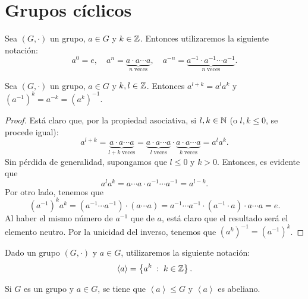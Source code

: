 \section{Grupos cíclicos}
\begin{notation}
Sea $\displaystyle \left(G, \cdot\right) $ un grupo, $\displaystyle a \in G $ y $\displaystyle k \in \mathbb{Z} $. Entonces utilizaremos la siguiente notación:
\[a^{0} = e, \quad a^{n} = \underbrace{a \cdot a \cdots a}_{n\; \text{veces}}, \quad a^{-n} = \underbrace{a^{-1} \cdot a^{-1} \cdots a^{-1}}_{n\; \text{veces}}  .\]
\end{notation}
\begin{lema}
Sea $\displaystyle \left(G, \cdot \right) $ un grupo, $\displaystyle a \in G $ y $\displaystyle k, l \in \mathbb{Z} $. Entonces $\displaystyle a^{l + k} = a^{l}a^{k} $ y $\displaystyle \left(a^{-1}\right)^{k}=a^{-k}=\left(a^{k}\right)^{-1} $.
\end{lema}
\begin{proof}
Está claro que, por la propiedad asociativa, si $\displaystyle l,k \in \mathbb{N} $ (o $\displaystyle l, k \leq 0 $, se procede igual):
\[ a^{l + k} = \underbrace{a \cdot a \cdots a}_{l + k \; \text{veces}} = \underbrace{a \cdot a \cdots a }_{l \; \text{veces}} \cdot \underbrace{a \cdot a \cdots a}_{k \; \text{veces}}=a^{l}a^{k} .\]
Sin pérdida de generalidad, supongamos que $\displaystyle l \leq 0 $ y $\displaystyle k > 0 $. Entonces, es evidente que
\[a^{l}a^{k} = a \cdots a \cdot a^{-1} \cdots a^{-1} = a^{l - k} .\]
Por otro lado, tenemos que
\[\left(a^{-1}\right)^{k}a^{k} = \left(a^{-1} \cdots a^{-1}\right) \cdot \left(a \cdots a\right) = a^{-1} \cdots a^{-1} \cdot \left(a^{-1} \cdot a\right) \cdot a \cdots a = e .\]
Al haber el mismo número de $\displaystyle a^{-1} $ que de $\displaystyle a $, está claro que el resultado será el elemento neutro. Por la unicidad del inverso, tenemos que $\displaystyle \left(a^{k}\right)^{-1} = \left(a^{-1}\right)^{k} $.
\end{proof}
\begin{notation}
Dado un grupo $\displaystyle \left(G, \cdot \right) $ y $\displaystyle a \in G $, utilizaremos la siguiente notación:
\[\left\langle a \right\rangle = \left\{ a^{k} \; : \; k \in \mathbb{Z}\right\}  .\]
\end{notation}
\begin{prop}
Si $\displaystyle G $ es un grupo y $\displaystyle a \in G $, se tiene que $\displaystyle \left\langle a \right\rangle \leq G $ y $\displaystyle \left\langle a \right\rangle  $ es abeliano.
\end{prop}
